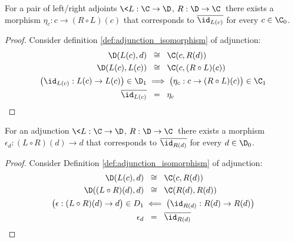 \begin{theorem}
  For a pair of left/right adjoints $\<L: \C \to \D$, $R:\D\to \C\>$
  there exists a morphism $\eta_c: c\to (R\circ L)(c)$ that corresponds to
  $\overline{\id_{L(c)}}$ for every $c\in \C_0$.

  \begin{proof}
    Consider definition \ref{def:adjunction_isomorphism} of adjunction:
    \[
      \begin{aligned}
        \D(L(c), d) &\ \:\cong\ \: \C(c, R(d))\\
        \D(L(c), L(c)) &\ \:\cong\ \: \C(c, (R\circ L)(c))\\
        \big(\id_{L(c)}: L(c) \to L(c)\big) \in \D_1
        &\implies \big(\eta_c : c \to (R\circ L)(c)\big)\in \C_1\\
        \overline{\id_{L(c)}} &\ \:=\ \:\eta_c
      \end{aligned}
    \]
  \end{proof}
\end{theorem}

\begin{theorem}
  For an adjunction $\<L: \C \to \D$, $R:\D\to \C\>$
  there exists a morphism $\epsilon_d: (L\circ R)(d)\to d$ that corresponds to
  $\overline{\id_{R(d)}}$ for every $d\in \D_0$.

  \begin{proof}
    Consider Definition \ref{def:adjunction_isomorphism} of adjunction:
    \[
      \begin{aligned}
        \D(L(c), d) &\ \:\cong\ \: \C(c, R(d))\\
        \D((L\circ R)(d), d) &\ \:\cong\ \: \C(R(d), R(d))\\
        \big(\epsilon:(L\circ R)(d)\to d\big)\in D_1 &\impliedby
          \big(\id_{R(d)}: R(d) \to R(d)\big)\\
        \epsilon_d &\ \:=\ \:\overline{\id_{R(d)}}
      \end{aligned}
    \]
  \end{proof}
\end{theorem}